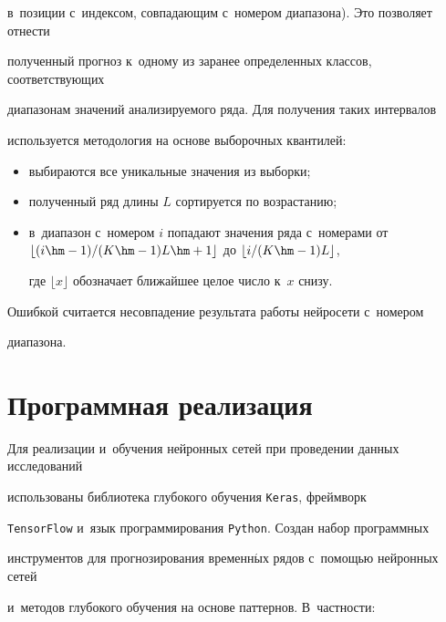 в~позиции с~индексом, сов\-па\-да\-ющим с~номером диапазона). Это позволяет отнести 


полученный прогноз к~одному из заранее определенных классов, со\-от\-вет\-ст\-ву\-ющих 


диапазонам значений анализируемого ряда. Для по\-лу\-че\-ния таких интервалов 


используется методология на осно\-ве выборочных кван\-тилей:


\begin{itemize}


\item выбираются все уникальные значения из выборки;


\item полученный ряд длины $L$ сортируется по возрастанию;


\item в~диапазон с~номером $i$ попадают значения ряда с~номерами от $\lfloor 


(i\hm-1)/(K\hm-1) L \hm+ 1\rfloor$ до $\lfloor i/(K\hm-1)  L\rfloor$, 


где $\lfloor x \rfloor$ обозначает ближайшее целое число к~$x$ снизу.


\end{itemize}





Ошибкой считается несовпадение результата работы нейросети с~номером 


диапазона.  





\section{Программная реализация} 





Для реализации и~обучения нейронных сетей при проведении данных исследований 


использованы библиотека глубокого обучения \verb"Keras", фреймворк 


\verb"TensorFlow" и~язык программирования \verb"Python". Создан набор программных 


инструментов для прогнозирования временн$\acute{\mbox{ы}}$х рядов с~по\-мощью нейронных сетей 


и~методов глубокого обучения на основе паттернов. В~частности:


